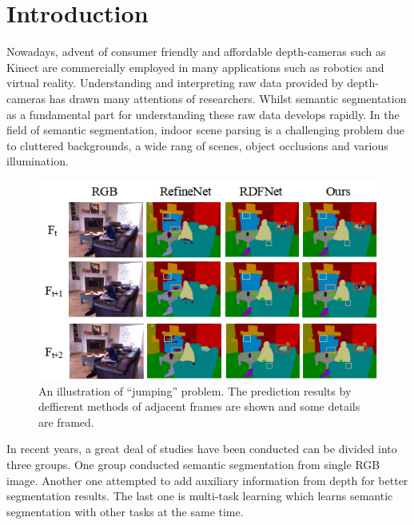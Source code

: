 \section{Introduction}
\label{sec:intro}
Nowadays, advent of consumer friendly and affordable depth-cameras such as Kinect are commercially employed in many applications such as robotics and virtual reality.
%
Understanding and interpreting raw data provided by depth-cameras has drawn many attentions of researchers.
%
Whilst semantic segmentation as a fundamental part for understanding these raw data develops rapidly.
%
In the field of semantic segmentation, indoor scene parsing is a challenging problem due to cluttered backgrounds, a wide rang of scenes, object occlusions and various illumination.

\begin{figure}[htbp]
	\includegraphics[scale=0.65]{figure/Consist.png}
	\vspace*{-0.6cm} 
	\caption{An illustration of “jumping” problem. The  prediction results by deffierent methods of adjacent frames are shown and some details are framed.}
	\label{fig:Consist}
	\vspace*{-0.35cm}
\end{figure}


In recent years, a great deal of studies have been conducted can be divided into three groups.
%
One group conducted semantic segmentation from single RGB image.
%
Another one attempted to add auxiliary information from depth for better segmentation results.
%
The last one is multi-task learning which learns semantic segmentation with other tasks at the same time.


